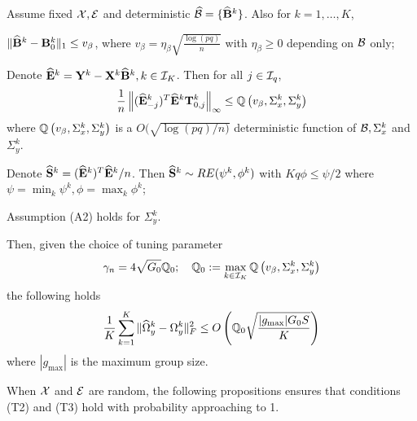 \documentclass[12pt, letterpaper]{article}
\numberwithin{equation}{section}
\begin{document}
\begin{Theorem}\label{thm:ThetaThm}
Assume fixed ${\cal{X}}, {\cal{E}}$ and deterministic $\widehat {{\cal{B}}} = \{ \widehat {{\mathbf{B}}}^k \}$. Also for $k = 1, \ldots, K$,

 $\| \widehat {{\mathbf{B}}}^k - {\mathbf{B}}^k_0 \|_1 \leq v_\beta$, where $v_\beta = \eta_\beta \sqrt{\frac{\log (pq)}{n}}$ with $\eta_\beta \geq 0$ depending on ${\cal{B}}$ only;


 Denote \textbf{$\widehat {{\mathbf{E}}}^k = {\mathbf{Y}}^k - {\mathbf{X}}^k \widehat {{\mathbf{B}}}^k, k \in {\cal{I}}_K$}. Then for all $j \in {\cal{I}}_q$,
%
$$
\frac{1}{n} \left\| (\widehat {{\mathbf{E}}}_{-j}^k)^T \widehat {{\mathbf{E}}}^k {\mathbf{T}}_{0,j}^k \right\|_\infty \leq
{\mathbb{Q}} \left(v_\beta, \Sigma_x^k, \Sigma_y^k \right)
$$
%
where ${\mathbb{Q}} \left(v_\beta, \Sigma_x^k, \Sigma_y^k \right)$ is a $O(\sqrt{ \log (pq)/ n)}$ deterministic function of ${\cal{B}}, \Sigma_x^k$ and $\Sigma_y^k$.

 Denote $\widehat {{\mathbf{S}}}^k = (\widehat {{\mathbf{E}}}^k)^T \widehat {{\mathbf{E}}}^k/n$. Then $\widehat {{\mathbf{S}}}^k \sim RE(\psi^k, \phi^k)$ with $Kq \phi \leq \psi/2$ where $ \psi = \min_k \psi^k, \phi = \max_k \phi^k $;

 Assumption (A2) holds for $\Sigma_y^k$.

Then, given the choice of tuning parameter
%
$$
\gamma_n = 4 \sqrt{G_0} {\mathbb{Q}}_0; \quad {\mathbb{Q}}_0 := \max_{k \in {\cal{I}}_K} {\mathbb{Q}} \left(v_\beta, \Sigma_x^k, \Sigma_y^k \right)
$$
%
the following holds
%
\begin{align*}
\frac{1}{K} \sum_{k=1}^K \| \widehat \Omega_y^k - \Omega_y^k \|_F^2 \leq
O \left( {\mathbb{Q}}_0 \sqrt{ \frac{ | g_{\max} | G_0 S}{K}} \right)
\end{align*}
%
where $|g_{\max}|$ is the maximum group size.


%
\end{Theorem}

When ${\cal{X}}$ and ${\cal{E}}$ are random, the following propositions ensures that conditions (T2) and (T3) hold with probability approaching to 1.
\end{document}
